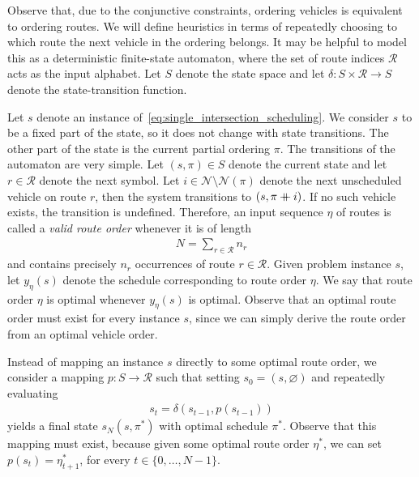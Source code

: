 \documentclass{article}
\newcommand\mdoubleplus{\mathbin{+\mkern-10mu+}}
\theoremstyle{definition}
\theoremstyle{plain}
\begin{document}
Observe that, due to the conjunctive constraints, ordering vehicles is
equivalent to ordering routes. We will define heuristics in terms of repeatedly
choosing to which route the next vehicle in the ordering belongs. It may be
helpful to model this as a deterministic finite-state automaton, where the set
of route indices $\mathcal{R}$ acts as the input alphabet. Let $S$ denote the
state space and let $\delta: S \times \mathcal{R} \rightarrow S$ denote the state-transition
function.

Let $s$ denote an instance of~\eqref{eq:single_intersection_scheduling}. We
consider $s$ to be a fixed part of the state, so it does not change with state
transitions.
The other part of the state is the current partial ordering $\pi$.
The transitions of the automaton are very simple. Let $(s, \pi) \in S$ denote
the current state and let $r \in \mathcal{R}$ denote the next symbol. Let
$i \in \mathcal{N} \setminus \mathcal{N}(\pi)$ denote the next unscheduled vehicle on route $r$,
then the system transitions to $(s, \pi \mdoubleplus i)$. If no such vehicle exists, the
transition is undefined.
%
%
Therefore, an input sequence $\eta$ of routes is called a \textit{valid route
  order} whenever it is of length
\begin{align*}
  N = \sum_{r \in \mathcal{R}} n_{r}
\end{align*}
and contains precisely $n_r$ occurrences of route $r \in \mathcal{R}$. Given
problem instance $s$, let $y_{\eta}(s)$ denote the schedule corresponding to route
order $\eta$. We say that route order $\eta$ is optimal whenever $y_{\eta}(s)$ is optimal.
Observe that an optimal route order must exist for every instance $s$, since we
can simply derive the route order from an optimal vehicle order.

Instead of mapping an instance $s$ directly to some optimal route order, we
consider a mapping $p : S \rightarrow \mathcal{R}$ such that setting $s_{0} = (s, \varnothing)$ and
repeatedly evaluating
\begin{align*}
  s_{t} = \delta(s_{t-1}, p(s_{t-1}))
\end{align*}
yields a final state $s_{N}(s, \pi^{*})$ with optimal schedule $\pi^{*}$.
Observe that this mapping must exist, because given some optimal route order
$\eta^{*}$, we can set $p(s_{t}) = \eta^{*}_{t+1}$, for every $t \in \{0, \dots, N-1\}$.
\end{document}
